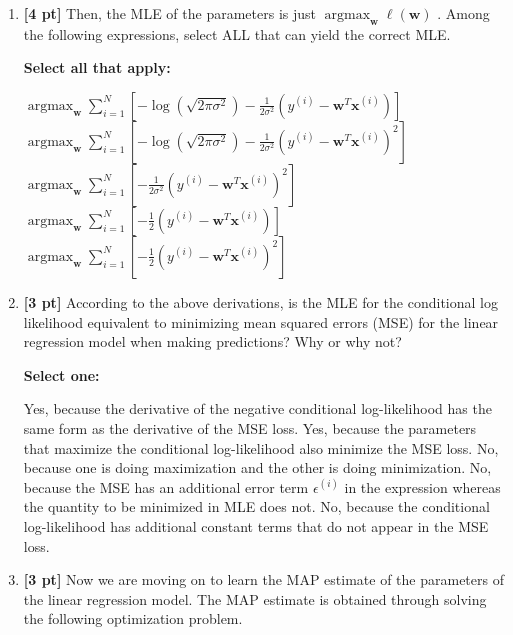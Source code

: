 \documentclass[12pt,addpoints,answers]{exam}
\newcommand{\argmax}{\mathop{\mathrm{argmax}}}
\begin{document}
\begin{enumerate}
    
    \item \textbf{[4 pt]} Then, the MLE of the parameters is just  $\argmax_{\mathbf{w}} \ell(\mathbf{w})$ . Among the following expressions, select ALL that can yield the correct MLE. 

    \textbf{Select all that apply:}
    {\checkboxchar{$\Box$} \checkedchar{$\blacksquare$}
        \begin{checkboxes}
        \choice $\argmax_{\mathbf{w}} \sum_{i=1}^{N} [-\log (\sqrt{2\pi\sigma^2}) - \frac{1}{2\sigma^2} (y^{(i)} - \mathbf{w}^T\mathbf{x}^{(i)})]$
        \choice $\argmax_{\mathbf{w}} \sum_{i=1}^{N} [-\log (\sqrt{2\pi\sigma^2}) - \frac{1}{2\sigma^2} (y^{(i)} - \mathbf{w}^T\mathbf{x}^{(i)})^2]$
        \choice $\argmax_{\mathbf{w}} \sum_{i=1}^{N} [- \frac{1}{2\sigma^2} (y^{(i)} - \mathbf{w}^T\mathbf{x}^{(i)})^2]$
        \choice $\argmax_{\mathbf{w}} \sum_{i=1}^{N} [- \frac{1}{2} (y^{(i)} - \mathbf{w}^T\mathbf{x}^{(i)})]$
        \choice $\argmax_{\mathbf{w}} \sum_{i=1}^{N} [- \frac{1}{2} (y^{(i)} - \mathbf{w}^T\mathbf{x}^{(i)})^2]$
    \end{checkboxes}
    }
    
    
    \clearpage
    
    \item \textbf{[3 pt]} According to the above derivations, is the MLE for the conditional log likelihood equivalent to minimizing mean squared errors (MSE) for the linear regression model when making predictions? Why or why not? 

    \textbf{Select one:}
    \begin{checkboxes}
        \choice Yes, because the derivative of the negative conditional log-likelihood has the same form as the derivative of the MSE loss. 
        \choice Yes, because the parameters that maximize the conditional log-likelihood also minimize the MSE loss.
        \choice No, because one is doing maximization and the other is doing minimization.
        \choice No, because the MSE has an additional error term $\epsilon^{(i)}$ in the expression whereas the quantity to be minimized in MLE does not. 
        \choice No, because the conditional log-likelihood has additional constant terms that do not appear in the MSE loss.
    \end{checkboxes}
    
    \item \textbf{[3 pt]} Now we are moving on to learn the MAP estimate of the parameters of the linear regression model. The MAP estimate is obtained through solving the following optimization problem.


\end{enumerate}
\end{document}
